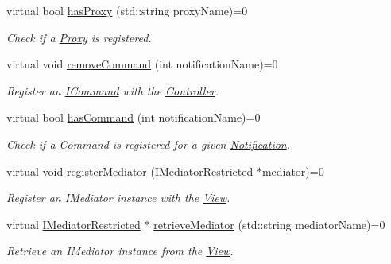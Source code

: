 \begin{DoxyCompactItemize}
virtual bool \hyperlink{class_pure_m_v_c_1_1_i_facade_a61b5a6f7c6d25c791b274093235f5c52}{hasProxy} (std::string proxyName)=0
\begin{DoxyCompactList}\small\item\em Check if a \hyperlink{class_pure_m_v_c_1_1_proxy}{Proxy} is registered. \item\end{DoxyCompactList}\item 
virtual void \hyperlink{class_pure_m_v_c_1_1_i_facade_ab102e77651cb2340c3f7387b04dc38dd}{removeCommand} (int notificationName)=0
\begin{DoxyCompactList}\small\item\em Register an {\ttfamily \hyperlink{class_pure_m_v_c_1_1_i_command}{ICommand}} with the {\ttfamily \hyperlink{class_pure_m_v_c_1_1_controller}{Controller}}. \item\end{DoxyCompactList}\item 
virtual bool \hyperlink{class_pure_m_v_c_1_1_i_facade_abeb340386026eaa9218e8581cda6a12d}{hasCommand} (int notificationName)=0
\begin{DoxyCompactList}\small\item\em Check if a Command is registered for a given \hyperlink{class_pure_m_v_c_1_1_notification}{Notification}. \item\end{DoxyCompactList}\item 
virtual void \hyperlink{class_pure_m_v_c_1_1_i_facade_af6849105c64d8841afce1cf7bb2b4d84}{registerMediator} (\hyperlink{class_pure_m_v_c_1_1_i_mediator_restricted}{IMediatorRestricted} $\ast$mediator)=0
\begin{DoxyCompactList}\small\item\em Register an {\ttfamily IMediator} instance with the {\ttfamily \hyperlink{class_pure_m_v_c_1_1_view}{View}}. \item\end{DoxyCompactList}\item 
virtual \hyperlink{class_pure_m_v_c_1_1_i_mediator_restricted}{IMediatorRestricted} $\ast$ \hyperlink{class_pure_m_v_c_1_1_i_facade_aa253e28220cf0f077ac212d0acf7652d}{retrieveMediator} (std::string mediatorName)=0
\begin{DoxyCompactList}\small\item\em Retrieve an {\ttfamily IMediator} instance from the {\ttfamily \hyperlink{class_pure_m_v_c_1_1_view}{View}}. \item\end{DoxyCompactList}\item 

\end{DoxyCompactItemize}
